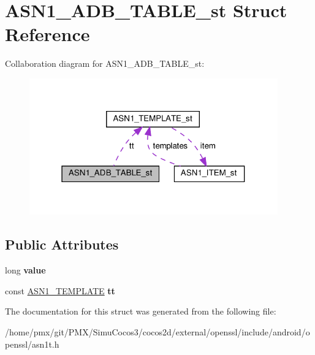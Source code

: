 \hypertarget{structASN1__ADB__TABLE__st}{}\section{A\+S\+N1\+\_\+\+A\+D\+B\+\_\+\+T\+A\+B\+L\+E\+\_\+st Struct Reference}
\label{structASN1__ADB__TABLE__st}


Collaboration diagram for A\+S\+N1\+\_\+\+A\+D\+B\+\_\+\+T\+A\+B\+L\+E\+\_\+st\+:
\nopagebreak
\begin{figure}[H]
\begin{center}
\leavevmode
\includegraphics[width=304pt]{structASN1__ADB__TABLE__st__coll__graph}
\end{center}
\end{figure}
\subsection*{Public Attributes}
\begin{DoxyCompactItemize}
\item 
\mbox{\label{structASN1__ADB__TABLE__st_a629d5818b02f9fb52b74bad469e1e5b0}} 
long {\bfseries value}
\item 
\mbox{\label{structASN1__ADB__TABLE__st_ae2a3f9d776e8c11c09d8b9879c63fac2}} 
const \hyperlink{structASN1__TEMPLATE__st}{A\+S\+N1\+\_\+\+T\+E\+M\+P\+L\+A\+TE} {\bfseries tt}
\end{DoxyCompactItemize}


The documentation for this struct was generated from the following file\+:\begin{DoxyCompactItemize}
\item 
/home/pmx/git/\+P\+M\+X/\+Simu\+Cocos3/cocos2d/external/openssl/include/android/openssl/asn1t.\+h\end{DoxyCompactItemize}
